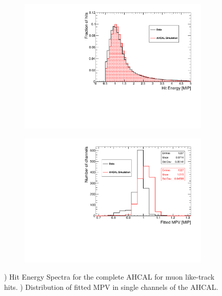 \begin{figure}[htbp!]
	\begin{subfigure}[t]{0.5\textwidth}
		\centering
		\includegraphics[width=1\linewidth]{../Thesis_Plots/EnergyCalib/Plots/ComparisonMCData_MIPPeak.pdf}
		\caption{} \label{fig:MIPData_MC}
	\end{subfigure}
	\hfill
	\begin{subfigure}[t]{0.5\textwidth}
		\centering
		\includegraphics[width=1\linewidth]{../Thesis_Plots/EnergyCalib/Plots/ComparisonMCData_MPV.pdf}
		\caption{} \label{fig:MPVData_MC}
	\end{subfigure}
	\caption{) Hit Energy Spectra for the complete AHCAL for muon like-track hits. ) Distribution of fitted MPV in single channels of the AHCAL.}
\end{figure}

